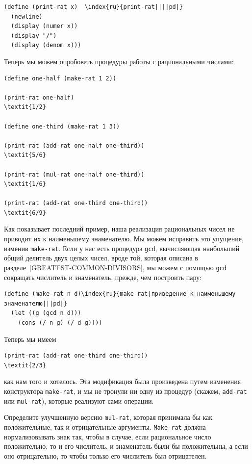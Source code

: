 \begin{Verbatim}[fontsize=\small]
(define (print-rat x)  \index{ru}{print-rat||||pd|}
  (newline)
  (display (numer x))
  (display "/")
  (display (denom x)))
\end{Verbatim}
Теперь мы можем опробовать процедуры работы с рациональными
числами:

\begin{Verbatim}[fontsize=\small]
(define one-half (make-rat 1 2))

(print-rat one-half)
\textit{1/2}

(define one-third (make-rat 1 3))

(print-rat (add-rat one-half one-third))
\textit{5/6}

(print-rat (mul-rat one-half one-third))
\textit{1/6}

(print-rat (add-rat one-third one-third))
\textit{6/9}
\end{Verbatim}

Как показывает последний пример, наша реализация
рациональных чисел не приводит их к наименьшему знаменателю.
Мы можем исправить это упущение, изменив
{\tt make-rat}.  Если у нас 
есть процедура {\tt gcd},
вычисляющая наибольший общий делитель
двух целых чисел, вроде той, которая описана в 
разделе~\ref{GREATEST-COMMON-DIVISORS}, мы можем с помощью
{\tt gcd} сокращать числитель и знаменатель, прежде, чем 
построить пару:

\begin{Verbatim}[fontsize=\small]
(define (make-rat n d)\index{ru}{make-rat|приведение к наименьшему знаменателю|||pd|}
  (let ((g (gcd n d)))
    (cons (/ n g) (/ d g))))
\end{Verbatim}
Теперь мы имеем

\begin{Verbatim}[fontsize=\small]
(print-rat (add-rat one-third one-third))
\textit{2/3}
\end{Verbatim}
как нам того и хотелось.  Эта модификация была произведена путем
изменения конструктора {\tt make-rat}, и мы не тронули ни одну
из процедур (скажем, {\tt add-rat} или {\tt mul-rat}),
которые реализуют сами операции.
\begin{exercise}{2.1}\label{EX2.1}%
Определите улучшенную версию {\tt mul-rat},
которая принимала бы как положительные, так и отрицательные
аргументы.  {\tt Make-rat} должна нормализовывать знак так,
чтобы в случае, если рациональное число положительно, то и его числитель, и
знаменатель были бы положительны, а если оно отрицательно, то чтобы только его
числитель был отрицателен.
\end{exercise}

